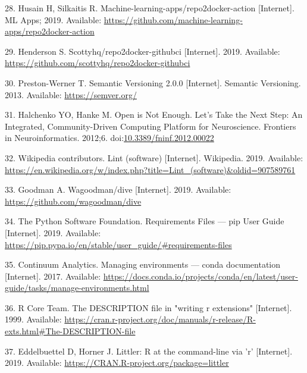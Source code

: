 \documentclass[10pt,letterpaper]{article}
\begin{document}
\leavevmode\hypertarget{ref-husain_repo2docker-action_2019}{}%
28. Husain H, Silkaitis R. Machine-learning-apps/repo2docker-action
{[}Internet{]}. ML Apps; 2019. Available:
\url{https://github.com/machine-learning-apps/repo2docker-action}

\leavevmode\hypertarget{ref-scottyhq_repo2docker-githubci_2019}{}%
29. Henderson S. Scottyhq/repo2docker-githubci {[}Internet{]}. 2019.
Available: \url{https://github.com/scottyhq/repo2docker-githubci}

\leavevmode\hypertarget{ref-preston-werner_semantic_2013}{}%
30. Preston-Werner T. Semantic Versioning 2.0.0 {[}Internet{]}. Semantic
Versioning. 2013. Available: \url{https://semver.org/}

\leavevmode\hypertarget{ref-halchenko_open_2012}{}%
31. Halchenko YO, Hanke M. Open is Not Enough. Let's Take the Next Step:
An Integrated, Community-Driven Computing Platform for Neuroscience.
Frontiers in Neuroinformatics. 2012;6.
doi:\href{https://doi.org/10.3389/fninf.2012.00022}{10.3389/fninf.2012.00022}

\leavevmode\hypertarget{ref-wikipedia_contributors_lint_2019}{}%
32. Wikipedia contributors. Lint (software) {[}Internet{]}. Wikipedia.
2019. Available:
\url{https://en.wikipedia.org/w/index.php?title=Lint_(software)\&oldid=907589761}

\leavevmode\hypertarget{ref-goodman_dive_2019}{}%
33. Goodman A. Wagoodman/dive {[}Internet{]}. 2019. Available:
\url{https://github.com/wagoodman/dive}

\leavevmode\hypertarget{ref-the_python_software_foundation_requirements_2019}{}%
34. The Python Software Foundation. Requirements Files --- pip User
Guide {[}Internet{]}. 2019. Available:
\url{https://pip.pypa.io/en/stable/user_guide/\#requirements-files}

\leavevmode\hypertarget{ref-continuum_analytics_managing_2017}{}%
35. Continuum Analytics. Managing environments --- conda documentation
{[}Internet{]}. 2017. Available:
\url{https://docs.conda.io/projects/conda/en/latest/user-guide/tasks/manage-environments.html}

\leavevmode\hypertarget{ref-r_core_team_description_1999}{}%
36. R Core Team. The DESCRIPTION file in "writing r extensions"
{[}Internet{]}. 1999. Available:
\url{https://cran.r-project.org/doc/manuals/r-release/R-exts.html\#The-DESCRIPTION-file}

\leavevmode\hypertarget{ref-eddelbuettel_littler_2019}{}%
37. Eddelbuettel D, Horner J. Littler: R at the command-line via 'r'
{[}Internet{]}. 2019. Available:
\url{https://CRAN.R-project.org/package=littler}
\end{document}
